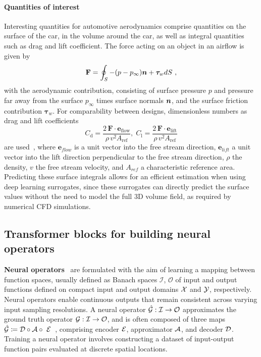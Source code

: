 \paragraph{Quantities of interest}
Interesting quantities for automotive aerodynamics comprise quantities on the surface of the car, in the volume around the car, as well as integral quantities such as drag and lift coefficient. 
The force acting on an object in an airflow is given by
\begin{align}
    \mathbf{F} = \oint_S -(p-p_\infty) \bm{n} + \bm{\tau}_w dS \ ,
\end{align}
with the aerodynamic contribution, consisting of surface pressure $p$ and pressure far away from the surface $p_\infty$ times surface normals $\bm{n}$, and the surface friction contribution $\bm{\tau}_w$.
For comparability between designs, dimensionless numbers as drag and lift coefficients
\begin{equation}
    C_\text{d} =   \frac{2\, \bm{F} \cdot \bm{e}_{\text{flow}}}{\rho\, v^2 A_\text{ref}}, \; C_\text{l} =   \frac{2\, \bm{F} \cdot \bm{e}_\text{lift}}{\rho\, v^2 A_\text{ref}}
\end{equation}
 are used~\citep{ashton2024drivaerml}, where $\bm{e}_{flow}$ is a unit vector into the free stream direction, $\bm{e}_{lift}$ a unit vector into the lift direction perpendicular to the free stream direction, $\rho$ the density, $v$ the free stream velocity, and $A_{ref}$ a characteristic reference area.
Predicting these surface integrals allows for an efficient estimation when using deep learning surrogates,
since these surrogates can directly predict the surface values without the need to model the full 3D volume field,
as required by numerical CFD simulations.

\subsection{Transformer blocks for building neural operators}
\label{sec:prelim-transformer}
\textbf{Neural operators}~\cite{Lu:21,Li:20graph,Li:20} are formulated with the aim of learning a mapping between function spaces, 
usually defined as Banach spaces $\mathcal{I}$, $\mathcal{O}$ of input and output functions defined on compact input and output domains $\mathcal{X}$ and $\mathcal{Y}$, respectively. 
Neural operators enable continuous outputs that remain consistent across varying input sampling resolutions.
A neural operator $\hat{{\mathcal{G}}} : \mathcal{I} \rightarrow \mathcal{O}$ approximates the ground truth operator ${\mathcal{G}}: \mathcal{I} \rightarrow \mathcal{O}$, and is often composed of three maps $\hat{\gG} \coloneqq \cD \circ \cA \circ \ \cE
$~\cite{Seidman:22,alkin2024universal,alkin2024neuraldem}, comprising encoder $\mathcal{E}$, approximator $\mathcal{A}$, 
and decoder $\mathcal{D}$. 
Training a neural operator involves constructing a dataset of input-output function pairs evaluated at discrete spatial locations. %

